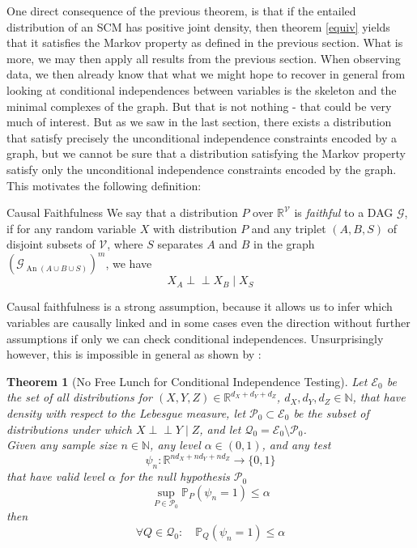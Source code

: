 \documentclass[11pt, a4paper]{memoir}
\theoremstyle{break}
\newtheorem{thm}{Theorem}
\theoremstyle{break}
\theoremstyle{nonumberplain}
\newcommand{\mN}{\mathbb{N}}
\newcommand{\mR}{\mathbb{R}}
\newcommand{\mP}{\mathbb{P}}
\newcommand{\indep}{\perp \!\!\! \perp}
\DeclareMathOperator{\an}{An}
\begin{document}
One direct consequence of the previous theorem, is that if the entailed distribution of an SCM has positive joint density, then theorem \ref{equiv} yields that it satisfies the Markov property as defined in the previous section. What is more, we may then apply all results from the previous section. When observing data, we then already know that what we might hope to recover in general from looking at conditional independences between variables is the skeleton and the minimal complexes of the graph. But that is not nothing - that could be very much of interest. But as we saw in the last section, there exists a distribution that satisfy precisely the unconditional independence constraints encoded by a graph, but we cannot be sure that a distribution satisfying the Markov property satisfy only the unconditional independence constraints encoded by the graph. This motivates the following definition:
\begin{mydefinition}{Causal Faithfulness}
We say that a distribution $P$ over $\mR^{\mathcal{V}}$ is \emph{faithful} to a DAG $\mathcal{G}$, if for any random variable $X$ with distribution $P$ and any triplet $(A,B,S)$ of disjoint subsets of $\mathcal{V}$, where $S$ separates $A$ and $B$ in the graph $\left(\mathcal{G}_{\an(A\cup B\cup S)}\right)^m$, we have
$$X_A\indep X_B\mid X_S$$
\end{mydefinition}
\noindent Causal faithfulness is a strong assumption, because it allows us to infer which variables are causally linked and in some cases even the direction without further assumptions if only we can check conditional independences. Unsurprisingly however, this is impossible in general as shown by \cite{CondIndTest}:
\begin{thm}[No Free Lunch for Conditional Independence Testing]
Let $\mathcal{E}_0$ be the set of all distributions for $(X,Y,Z)\in \mR^{d_X+d_Y+d_Z}$, $d_X,d_Y,d_Z\in \mN$, that have density with respect to the Lebesgue measure, let $\mathcal{P}_0\subset \mathcal{E_0}$ be the subset of distributions under which $X\indep Y\mid Z$, and let $\mathcal{Q}_0=\mathcal{E}_0\setminus\mathcal{P}_0$.\\[5pt]
Given any sample size $n\in \mN$, any level $\alpha\in (0,1)$, and any test
$$\psi_n:\mR^{nd_X+nd_Y+nd_Z}\to \{0,1\}$$
that have valid level $\alpha$ for the null hypothesis $\mathcal{P}_0$
$$\sup_{P\in \mathcal{P}_0}\mP_P(\psi_n=1)\leq \alpha$$
then
$$\forall Q\in \mathcal{Q}_0:\quad \mP_Q(\psi_n=1)\leq \alpha$$
\end{thm}
\end{document}
